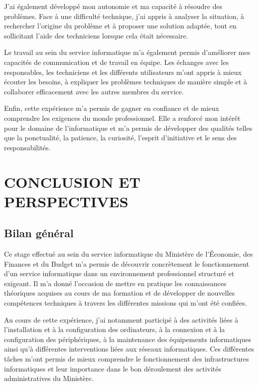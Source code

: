 \documentclass[12pt,a4paper]{article}
\begin{document}
J’ai également développé mon autonomie et ma capacité à résoudre des problèmes. Face à une difficulté technique, j’ai appris à analyser la situation, à rechercher l’origine du problème et à proposer une solution adaptée, tout en sollicitant l’aide des techniciens lorsque cela était nécessaire.

Le travail au sein du service informatique m’a également permis d’améliorer mes capacités de communication et de travail en équipe. Les échanges avec les responsables, les techniciens et les différents utilisateurs m’ont appris à mieux écouter les besoins, à expliquer les problèmes techniques de manière simple et à collaborer efficacement avec les autres membres du service.

Enfin, cette expérience m’a permis de gagner en confiance et de mieux comprendre les exigences du monde professionnel. Elle a renforcé mon intérêt pour le domaine de l’informatique et m’a permis de développer des qualités telles que la ponctualité, la patience, la curiosité, l’esprit d’initiative et le sens des responsabilités.



\section{CONCLUSION ET PERSPECTIVES}

\subsection{Bilan général}


Ce stage effectué au sein du service informatique du Ministère de l’Économie, des Finances et du Budget m’a permis de découvrir concrètement le fonctionnement d’un service informatique dans un environnement professionnel structuré et exigeant. Il m’a donné l’occasion de mettre en pratique les connaissances théoriques acquises au cours de ma formation et de développer de nouvelles compétences techniques à travers les différentes missions qui m’ont été confiées.

Au cours de cette expérience, j’ai notamment participé à des activités liées à l’installation et à la configuration des ordinateurs, à la connexion et à la configuration des périphériques, à la maintenance des équipements informatiques ainsi qu’à différentes interventions liées aux réseaux informatiques. Ces différentes tâches m’ont permis de mieux comprendre le fonctionnement des infrastructures informatiques et leur importance dans le bon déroulement des activités administratives du Ministère.
\end{document}
